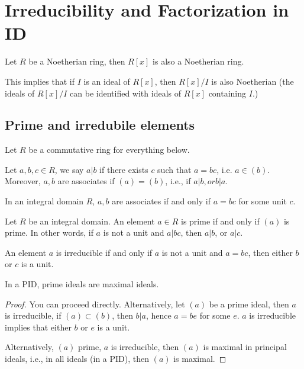 \chapter{Irreducibility and Factorization in ID}


\begin{thm}
    Let $R$ be a Noetherian ring, then $R[x]$ is also a Noetherian ring.

    This implies that if $I$ is an ideal of $R[x]$, then $R[x]/I$ is also Noetherian (the ideals of $R[x]/I$ can be identified with ideals of $R[x]$ containing $I$.)
\end{thm}

\section{Prime and irredubile elements}
Let $R$ be a commutative ring for everything below.
\begin{defn}
    Let $a,b,c\in R$, we say $a\vert b$ if there exists $c$ such that $a=bc$, i.e. $a\in (b)$. Moreover, $a,b$ are associates if $(a)=(b)$, i.e., if $a\vert b, or b\vert a$.
\end{defn}
\begin{prop}
    In an integral domain $R$, $a,b$ are associates if and only if $a=bc$ for some unit $c$.
\end{prop}

\begin{defn}
    Let $R$ be an integral domain.
    An element $a\in R$ is prime if and only if $(a)$ is prime. In other words, if $a$ is not a unit and $a\vert bc$, then $a\vert b$, or $a\vert c$.

    An element $a$ is irreducible if and only if $a$ is not a unit and $a=bc$, then either $b$ or $c$ is a unit.
\end{defn}


\begin{prop}
    In a PID, prime ideals are maximal ideals.

    \begin{proof}
        You can proceed directly. Alternatively, let $(a)$ be a prime ideal, then $a$ is irreducible, if $(a)\subset (b)$, then $b\vert a$, hence $a=be$ for some $e$. $a$ is irreducible implies that either $b$ or $e$ is a unit.

        Alternatively, $(a)$ prime, $a$ is irreducible, then $(a)$ is maximal in principal ideals, i.e., in all ideals (in a PID), then $(a)$ is maximal.
    \end{proof}
\end{prop}

